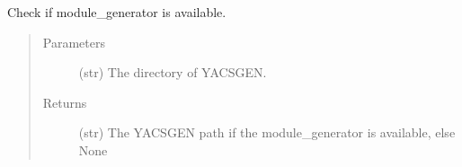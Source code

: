 \documentclass[a4paper,10pt,english]{sphinxmanual}
\begin{document}

\begin{fulllineitems}
\label{\detokenize{apidoc_commands/commands:commands.generate.build_context}}
\end{fulllineitems}


\begin{fulllineitems}
\label{\detokenize{apidoc_commands/commands:commands.generate.check_module_generator}}
Check if module\_generator is available.
\begin{quote}\begin{description}
\item[{Parameters}] \leavevmode
{} \textendash{} (str) The directory of YACSGEN.

\item[{Returns}] \leavevmode
(str) 
The YACSGEN path if the module\_generator is available, else None

\end{description}\end{quote}

\end{fulllineitems}

\end{document}
